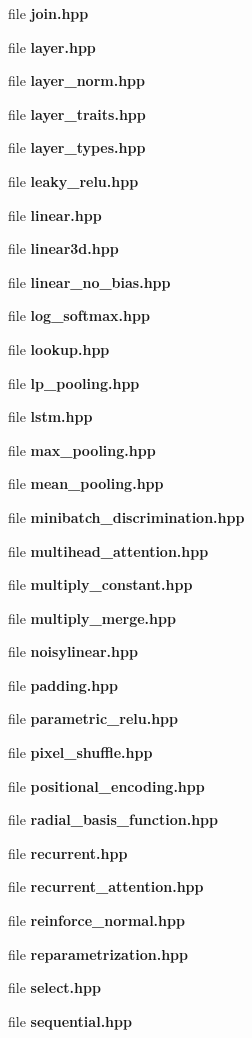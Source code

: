 \begin{DoxyCompactItemize}
file \textbf{ join.\+hpp}
\item 
file \textbf{ layer.\+hpp}
\item 
file \textbf{ layer\+\_\+norm.\+hpp}
\item 
file \textbf{ layer\+\_\+traits.\+hpp}
\item 
file \textbf{ layer\+\_\+types.\+hpp}
\item 
file \textbf{ leaky\+\_\+relu.\+hpp}
\item 
file \textbf{ linear.\+hpp}
\item 
file \textbf{ linear3d.\+hpp}
\item 
file \textbf{ linear\+\_\+no\+\_\+bias.\+hpp}
\item 
file \textbf{ log\+\_\+softmax.\+hpp}
\item 
file \textbf{ lookup.\+hpp}
\item 
file \textbf{ lp\+\_\+pooling.\+hpp}
\item 
file \textbf{ lstm.\+hpp}
\item 
file \textbf{ max\+\_\+pooling.\+hpp}
\item 
file \textbf{ mean\+\_\+pooling.\+hpp}
\item 
file \textbf{ minibatch\+\_\+discrimination.\+hpp}
\item 
file \textbf{ multihead\+\_\+attention.\+hpp}
\item 
file \textbf{ multiply\+\_\+constant.\+hpp}
\item 
file \textbf{ multiply\+\_\+merge.\+hpp}
\item 
file \textbf{ noisylinear.\+hpp}
\item 
file \textbf{ padding.\+hpp}
\item 
file \textbf{ parametric\+\_\+relu.\+hpp}
\item 
file \textbf{ pixel\+\_\+shuffle.\+hpp}
\item 
file \textbf{ positional\+\_\+encoding.\+hpp}
\item 
file \textbf{ radial\+\_\+basis\+\_\+function.\+hpp}
\item 
file \textbf{ recurrent.\+hpp}
\item 
file \textbf{ recurrent\+\_\+attention.\+hpp}
\item 
file \textbf{ reinforce\+\_\+normal.\+hpp}
\item 
file \textbf{ reparametrization.\+hpp}
\item 
file \textbf{ select.\+hpp}
\item 
file \textbf{ sequential.\+hpp}
\item 

\end{DoxyCompactItemize}
